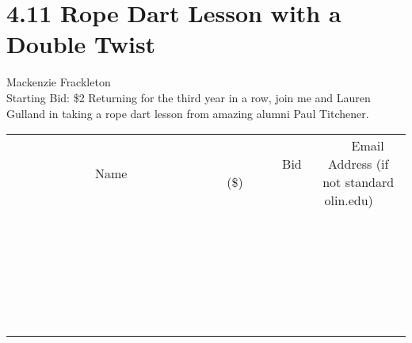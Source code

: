 \documentclass[11pt]{article}
\begin{document}
\section*{4.11 Rope Dart Lesson with a Double Twist}
Mackenzie Frackleton 
\\
Starting Bid: \$2
\newline
Returning for the third year in a row, join me and Lauren Gulland in taking a rope dart lesson from amazing alumni Paul Titchener.
\\[6ex]
\begin{tabular}{c c c}
~~~~~~~~~~~~~Name~~~~~~~~~~~~~ & ~~~~~~~~~Bid (\$)~~~~~~~~~  & ~~~Email Address (if not standard olin.edu)~~~\\
 & & \\
\hline
 & & \\
\hline
 & & \\
\hline
 & & \\
\hline
 & & \\
\hline
 & & \\
\hline
 & & \\
\hline
 & & \\
\hline
 & & \\
\hline
 & & \\
\hline
 & & \\
\hline
 & & \\
\hline
 & & \\
\hline
 & & \\
\hline
 & & \\
\hline
 & & \\
\hline
 & & \\
\hline
 & & \\
\hline
 & & \\
\hline
 & & \\
\hline
 & & \\
\hline
 & & \\
\hline
 & & \\
\hline
 & & \\
\hline
 & & \\
\hline
 & & \\
\hline
\end{tabular}
\newpage
\end{document}
